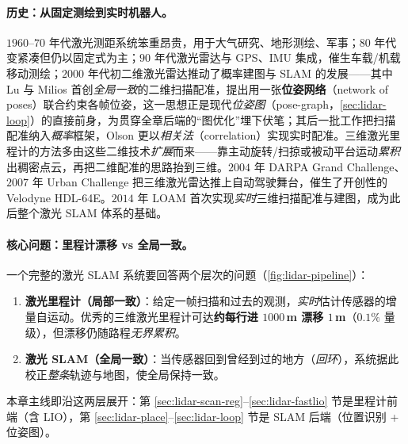\paragraph{历史：从固定测绘到实时机器人。}
$1960$–$70$ 年代激光测距系统笨重昂贵，用于大气研究、地形测绘、军事\cite{carlone2026handbook}；$80$ 年代变紧凑但仍以固定式为主；$90$ 年代激光雷达与 GPS、IMU 集成，催生车载/机载移动测绘；$2000$ 年代初二维激光雷达推动了概率建图与 SLAM 的发展——其中 Lu 与 Milios 首创\emph{全局一致}的二维扫描配准，提出用一张\textbf{位姿网络}（network of poses）联合约束各帧位姿，这一思想正是现代\emph{位姿图}（pose-graph，\cref{sec:lidar-loop}）的直接前身，为贯穿全章后端的“图优化”埋下伏笔；其后一批工作把扫描配准纳入\emph{概率}框架，Olson 更以\emph{相关法}（correlation）实现实时配准\cite{carlone2026handbook}。三维激光里程计的方法多由这些二维技术\emph{扩展}而来——靠主动旋转/扫掠或被动平台运动\emph{累积}出稠密点云，再把二维配准的思路抬到三维。$2004$ 年 DARPA Grand Challenge、$2007$ 年 Urban Challenge 把三维激光雷达推上自动驾驶舞台，催生了开创性的 Velodyne HDL-64E。$2014$ 年 LOAM\cite{zhang2014loam} 首次实现\emph{实时}三维扫描配准与建图，成为此后整个激光 SLAM 体系的基础。

\paragraph{核心问题：里程计漂移 vs 全局一致。}
一个完整的激光 SLAM 系统要回答两个层次的问题（\cref{fig:lidar-pipeline}）：
\begin{enumerate}
  \item \textbf{激光里程计（局部一致）}：给定一帧扫描和过去的观测，\emph{实时}估计传感器的增量自运动。优秀的三维激光里程计可达\textbf{约每行进 $1000$\,m 漂移 $1$\,m}（$0.1\%$ 量级）\cite{carlone2026handbook}，但漂移仍随路程\emph{无界累积}。
  \item \textbf{激光 SLAM（全局一致）}：当传感器回到曾经到过的地方（\emph{回环}），系统据此校正\emph{整条}轨迹与地图，使全局保持一致。
\end{enumerate}
本章主线即沿这两层展开：第 \ref{sec:lidar-scan-reg}–\ref{sec:lidar-fastlio} 节是里程计前端（含 LIO），第 \ref{sec:lidar-place}–\ref{sec:lidar-loop} 节是 SLAM 后端（位置识别 + 位姿图）。

